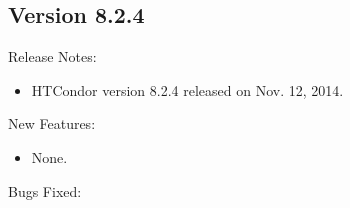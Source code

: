 \subsection*{\label{sec:New-8-2-4}Version 8.2.4}

\noindent Release Notes:

\begin{itemize}

\item HTCondor version 8.2.4 released on Nov. 12, 2014.

\end{itemize}


\noindent New Features:

\begin{itemize}

\item None.
\end{itemize}

\noindent Bugs Fixed:

